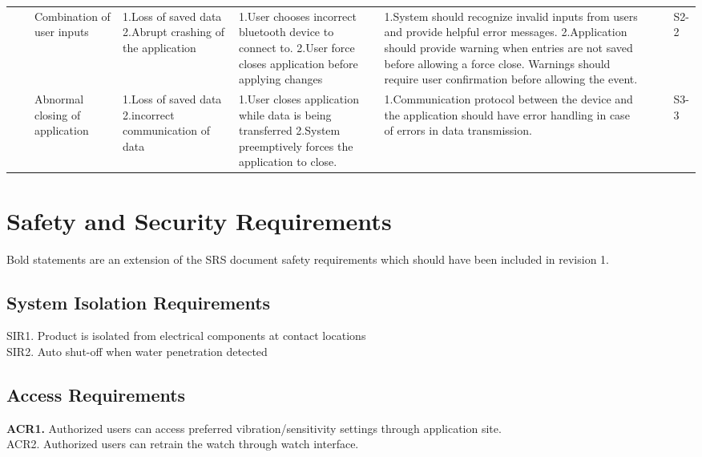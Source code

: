 \documentclass{article}
\begin{document}
\begin{table}[H]
\begin{tabular}{| p{} | p{}  | p{} | p{} | p{} | p{} | p{} | p{} | p{} |}
     & & Combination of user inputs & 1.Loss of saved data \newline 2.Abrupt crashing of the application  &  1.User chooses incorrect bluetooth device to connect to. \newline 2.User force closes application before applying changes  &  1.System should recognize invalid inputs from users and provide helpful error messages. \newline 2.Application should provide warning when entries are not saved before allowing a force close. Warnings should require user confirmation before allowing the event.  &  &  & S2-2 \\ \cline{3-9}

     & & Abnormal closing of application & 1.Loss of saved data \newline 2.incorrect communication of data  & 1.User closes application while data is being transferred \newline 2.System preemptively forces the application to close. & 1.Communication protocol between the device and the application should have error handling in case of errors in data transmission.  & & & S3-3 \\ \hline
    
    \end{tabular}
    \hspace*{-1cm}
    \end{table}

\newpage 
\section{Safety and Security Requirements}

Bold statements are an extension of the SRS document safety requirements which should have been included in revision 1.

\subsection{System Isolation Requirements}

SIR1. Product is isolated from electrical components at contact locations
\\SIR2. Auto shut-off when water penetration detected

\subsection{Access Requirements}

\textbf{ACR1.} Authorized users can access preferred vibration/sensitivity settings through application site.
\\ACR2. Authorized users can retrain the watch through watch interface. 
\end{document}
